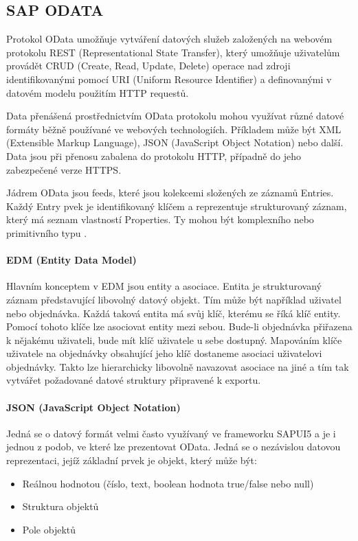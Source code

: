 \documentclass[thesis=M,czech]{FITthesis}[2012/06/26]
\begin{document}
\subsection{SAP ODATA}
\label{ssec:odata}
Protokol OData umožňuje vytváření datových služeb založených na webovém protokolu REST (Representational State Transfer), který umožňuje uživatelům provádět CRUD (Create, Read, Update, Delete) operace nad zdroji identifikovanými pomocí URI (Uniform Resource Identifier) a definovanými v datovém modelu použitím HTTP requestů.

Data přenášená prostřednictvím OData protokolu mohou využívat různé datové formáty běžně používané ve webových technologiích. Příkladem může být XML (Extensible Markup Language), JSON (JavaScript Object Notation) nebo další. Data jsou při přenosu zabalena do protokolu HTTP, případně do jeho zabezpečené verze HTTPS.

Jádrem OData jsou feeds, které jsou kolekcemi složených ze záznamů Entries. Každý Entry pvek je identifikovaný klíčem a reprezentuje strukturovaný záznam, který má seznam vlastností Properties. Ty mohou být komplexního nebo primitivního typu \cite{mvc}.

\paragraph{EDM (Entity Data Model)} Hlavním konceptem v EDM jsou entity a asociace. Entita je strukturovaný záznam představující libovolný datový objekt. Tím může být například uživatel nebo objednávka. Každá taková entita má svůj klíč, kterému se říká klíč entity. Pomocí tohoto klíče lze asociovat entity mezi sebou. Bude-li objednávka přiřazena k nějakému uživateli, bude mít klíč uživatele u sebe dostupný. Mapováním klíče uživatele na objednávky obsahující jeho klíč dostaneme asociaci uživatelovi objednávky. Takto lze hierarchicky libovolně navazovat asociace na jiné a tím tak vytvářet požadované datové struktury připravené k exportu. 

\paragraph{JSON (JavaScript Object Notation)}
\label{par:json}
Jedná se o datový formát velmi často využívaný ve frameworku SAPUI5 a je i jednou z podob, ve které lze prezentovat OData. Jedná se o nezávislou datovou reprezentaci, jejíž základní prvek je objekt, který může být:
\begin{itemize}
	\item
	Reálnou hodnotou (číslo, text, boolean hodnota true/false nebo null)
	\item
	Struktura objektů
    \item
	Pole objektů	
\end{itemize} 
\end{document}
